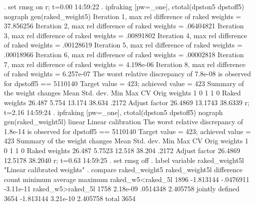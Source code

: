 . set rmsg on
r; t=0.00 14:59:22
{\smallskip}
. ipfraking [pw=_one], ctotal(dpston5 dpstoff5) nograph gen(raked_weight5)
{\smallskip}
 Iteration 1, max rel difference of raked weights = 37.856256
 Iteration 2, max rel difference of raked weights = .06404821
 Iteration 3, max rel difference of raked weights = .00891802
 Iteration 4, max rel difference of raked weights = .00128619
 Iteration 5, max rel difference of raked weights = .00018966
 Iteration 6, max rel difference of raked weights = .00002818
 Iteration 7, max rel difference of raked weights = 4.198e-06
 Iteration 8, max rel difference of raked weights = 6.257e-07
The worst relative discrepancy of  7.8e-08 is observed for dpstoff5 == 5110140
Target value =        423; achieved value =        423
{\smallskip}
   Summary of the weight changes
{\smallskip}
              {\VBAR}    Mean    Std. dev.    Min        Max       CV
Orig weights  {\VBAR}        1          0         1           1       0
Raked weights {\VBAR}   26.487      5.754    13.174      38.634   .2172
Adjust factor {\VBAR}  26.4869              13.1743     38.6339
r; t=2.16 14:59:24
{\smallskip}
. ipfraking [pw=_one], ctotal(dpston5 dpstoff5) nograph gen(raked_weight5l) linear
{\smallskip}
Linear calibration
The worst relative discrepancy of  1.8e-14 is observed for dpstoff5 == 5110140
Target value =        423; achieved value =        423
{\smallskip}
   Summary of the weight changes
{\smallskip}
              {\VBAR}    Mean    Std. dev.    Min        Max       CV
Orig weights  {\VBAR}        1          0         1           1       0
Raked weights {\VBAR}   26.487     5.7523    12.518      38.204   .2172
Adjust factor {\VBAR}  26.4869              12.5178     38.2040
r; t=0.63 14:59:25
{\smallskip}
. set rmsg off
{\smallskip}
. label variable raked_weight5l "Linear calibrated weights"
{\smallskip}
. compare raked_weight5 raked_weight5l
{\smallskip}
                                         difference 
                            count       minimum      average     maximum
raked_w{\tytilde}5<raked_{\tytilde}5l          1896     -1.813144    -.0476911   -3.11e-11
raked_w{\tytilde}5>raked_{\tytilde}5l          1758      2.18e-09     .0514348    2.405758
jointly defined              3654     -1.813144     3.21e-10    2.405758
total                        3654
{\smallskip}
